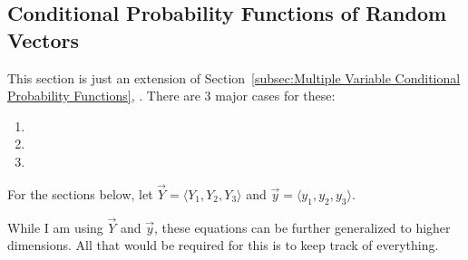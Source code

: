 	\subsection{Conditional Probability Functions of Random Vectors} \label{subsec:Random Vector Conditional Probability Functions}
	This section is just an extension of Section~\ref{subsec:Multiple Variable Conditional Probability Functions}, .
	There are 3 major cases for these:
		\begin{enumerate}
			\item {}
			\item {}
			\item {}
		\end{enumerate}
	
		\begin{remark*} \label{rmk:Define Random Vector Y for Example}
			\begin{large}
				For the sections below, let $\vec{Y}= \langle Y_{1},Y_{2},Y_{3} \rangle$ and $\vec{y}= \langle y_{1},y_{2},y_{3} \rangle$.
			\end{large} \newline
			While I am using $\vec{Y}$ and $\vec{y}$, these equations can be further generalized to higher dimensions.
			All that would be required for this is to keep track of everything.
		\end{remark*}
	
